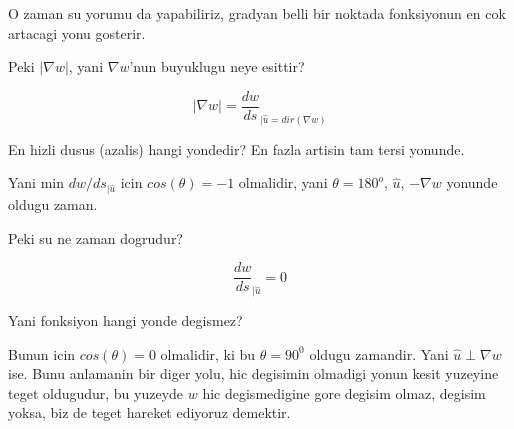 \documentclass[12pt,fleqn]{article}
\begin{document}
O zaman su yorumu da yapabiliriz, gradyan belli bir noktada fonksiyonun en
cok artacagi yonu gosterir. 

Peki $|\nabla w|$, yani $\nabla w$'nun buyuklugu neye esittir? 

\[ |\nabla w| =   \frac{dw}{ds}_{|\hat{u}=dir(\nabla w)}  \]

En hizli dusus (azalis) hangi yondedir? En fazla artisin tam tersi
yonunde. 

Yani min $dw/ds_{|\hat{u}}$ icin $cos(\theta) = -1$ olmalidir, yani $\theta =
180^o$,  $\hat{u}$, $-\nabla w$ 
yonunde oldugu zaman.

Peki su ne zaman dogrudur? 

\[ \frac{dw}{ds}_{|\hat{u}} = 0 \]

Yani fonksiyon hangi yonde degismez? 

Bunun icin $cos(\theta) = 0$ olmalidir, ki bu $\theta = 90^0$ oldugu
zamandir. Yani $\hat{u} \perp \nabla w$ ise. Bunu anlamanin bir diger yolu,
hic degisimin olmadigi yonun kesit yuzeyine teget oldugudur, bu yuzeyde $w$
hic degismedigine gore degisim olmaz, degisim yoksa, biz de teget hareket
ediyoruz demektir. 
\end{document}
